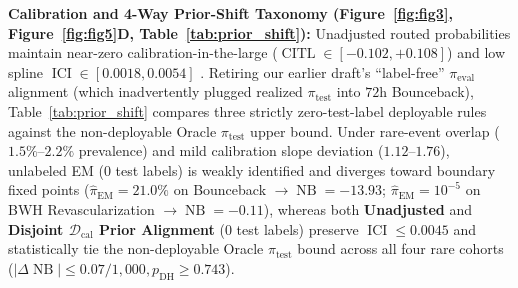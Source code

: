 \documentclass[11pt]{article}
\theoremstyle{remark}
\begin{document}
\textbf{Calibration and 4-Way Prior-Shift Taxonomy (Figure~\ref{fig:fig3}, Figure~\ref{fig:fig5}D, Table~\ref{tab:prior_shift}):} Unadjusted routed probabilities maintain near-zero calibration-in-the-large ($\operatorname{CITL} \in [-0.102, +0.108]$) and low spline $\operatorname{ICI} \in [0.0018, 0.0054]$ \citep{vancalster2019calibration,austin2019integrated}. Retiring our earlier draft's ``label-free'' $\pi_{\text{eval}}$ alignment (which inadvertently plugged realized $\pi_{\text{test}}$ into $72\text{h}$ Bounceback), Table~\ref{tab:prior_shift} compares three strictly zero-test-label deployable rules against the non-deployable Oracle $\pi_{\text{test}}$ upper bound. Under rare-event overlap ($1.5\%\text{--}2.2\%$ prevalence) and mild calibration slope deviation ($1.12\text{--}1.76$), unlabeled \citet{saerens2002adjusting} EM ($0$ test labels) is weakly identified and diverges toward boundary fixed points ($\hat{\pi}_{\text{EM}}=21.0\%$ on Bounceback $\to \operatorname{NB}=-13.93$; $\hat{\pi}_{\text{EM}}=10^{-5}$ on BWH Revascularization $\to \operatorname{NB}=-0.11$), whereas both \textbf{Unadjusted} and \textbf{Disjoint $\mathcal{D}_{\text{cal}}$ Prior Alignment} ($0$ test labels) preserve $\operatorname{ICI} \le 0.0045$ and statistically tie the non-deployable Oracle $\pi_{\text{test}}$ bound across all four rare cohorts ($|\Delta\operatorname{NB}| \le 0.07/1{,}000, p_{\text{DH}} \ge 0.743$).
\end{document}
